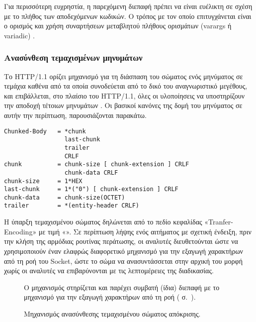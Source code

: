 
Για περισσότερη ευχρηστία, η παρεχόμενη διεπαφή πρέπει να είναι ευέλικτη σε
σχέση με το πλήθος των αποδεχόμενων κωδικών. Ο τρόπος με τον οποίο επιτυγχάνεται
είναι ο ορισμός και χρήση συναρτήσεων μεταβλητού πλήθους ορισμάτων (varargs ή
variadic) \parencite{iso:c99}.


\subsubsection{Ανασύνθεση τεμαχισμένων μηνυμάτων}
\label{ssubsec:network:chunked-input}

Το HTTP/1.1 ορίζει μηχανισμό για τη διάσπαση του σώματος ενός μηνύματος σε
τεμάχια καθένα από τα οποία συνοδεύεται από το δικό του αναγνωριστικό μεγέθους,
και επιβάλλεται, στο πλαίσιο του HTTP/1.1, όλες οι υλοποίησεις να υποστηρίζουν
την αποδοχή τέτοιων μηνυμάτων \parencite[25--26]{rfc2616}. Οι βασικοί κανόνες
της δομή του μηνύματος σε αυτήν την περίπτωση, παρουσιάζονται παρακάτω.

\begin{lstlisting}
Chunked-Body   = *chunk
                 last-chunk
                 trailer
                 CRLF
chunk          = chunk-size [ chunk-extension ] CRLF
                 chunk-data CRLF
chunk-size     = 1*HEX
last-chunk     = 1*("0") [ chunk-extension ] CRLF
chunk-data     = chunk-size(OCTET)
trailer        = *(entity-header CRLF)
\end{lstlisting}

Η ύπαρξη τεμαχισμένου σώματος δηλώνεται από το πεδίο κεφαλίδας
«Tranfer-Encoding» με τιμή «». Σε περίπτωση λήψης ενός αιτήματος με
σχετική ένδειξη, πριν την κλήση της αρμόδιας ρουτίνας περάτωσης, οι αναλυτές
διευθετούνται ώστε να χρησιμοποιούν έναν ελαφρώς διαφορετικό μηχανισμό για την
εξαγωγή χαρακτήρων από τη ροή του Socket, ώστε το σώμα να ανασυντάσσεται στην
αρχική του μορφή χωρίς οι αναλυτές να επιβαρύνονται με τις λεπτομέρειες της
διαδικασίας.

\begin{figure}
    \caption{Μηχανισμός ανασύνθεσης τεμαχισμένου σώματος απόκρισης.
    \label{fig:network:chunked-next}}
    Ο μηχανισμός στηρίζεται και παρέχει συμβατή (ίδια) διεπαφή με το μηχανισμό
    για την εξαγωγή χαρακτήρων από τη ροή
    ( σ.~\pageref{ssubsec:network:sbuffer}).
    \begin{center}
    \end{center}
\end{figure}


